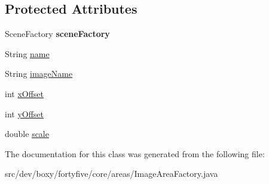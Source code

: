 \subsection*{Protected Attributes}
\begin{DoxyCompactItemize}
\item 
\hypertarget{classdev_1_1boxy_1_1fortyfive_1_1core_1_1areas_1_1_image_area_factory_a68238d01010e247f3b9d37b82011af91}{
SceneFactory {\bfseries sceneFactory}}
\label{d0/dc6/classdev_1_1boxy_1_1fortyfive_1_1core_1_1areas_1_1_image_area_factory_a68238d01010e247f3b9d37b82011af91}

\item 
String \hyperlink{group___image_area_gaa9289d9690489b0fd14e7091530970b7}{name}
\item 
String \hyperlink{group___image_area_ga8438aa6e7397dd740b77fe0fbf660936}{imageName}
\item 
int \hyperlink{group___image_area_ga8f5f4265e2db6213e49b143287bdb5d9}{xOffset}
\item 
int \hyperlink{group___image_area_ga7741b37a22cdb63f6448186c06f61d05}{yOffset}
\item 
double \hyperlink{group___image_area_ga8bf0ff1badd6a9a4c2244a555f24406b}{scale}
\end{DoxyCompactItemize}


The documentation for this class was generated from the following file:\begin{DoxyCompactItemize}
\item 
src/dev/boxy/fortyfive/core/areas/ImageAreaFactory.java\end{DoxyCompactItemize}
